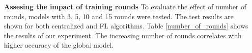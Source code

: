 \textbf{Assesing the impact of training rounds} To evaluate the effect of number of rounds, models with 3, 5, 10 and 15 rounds were tested. The test results are shown for both centralized and FL  algorithms. Table \ref{number_of_rounds} shows the results of our experiment. The increasing number of rounds correlates with higher accuracy of the global model.







 


